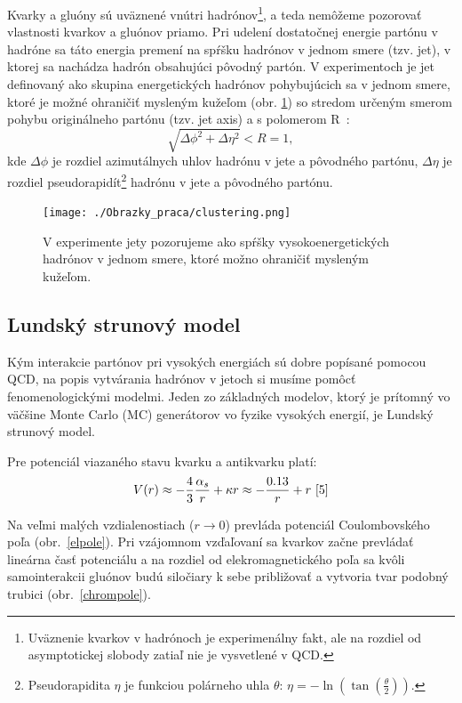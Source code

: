 \documentclass[thesismargins, thesislinespacing]{rnthesis}
\begin{document}
Kvarky a gluóny sú uväznené vnútri hadrónov\footnote{Uväznenie kvarkov v hadrónoch je experimenálny fakt, ale na rozdiel od asymptotickej slobody zatiaľ nie je vysvetlené v QCD.}, a teda nemôžeme pozorovať vlastnosti kvarkov a gluónov priamo. Pri udelení dostatočnej energie partónu v hadróne sa táto energia premení na spŕšku hadrónov v jednom smere (tzv. jet), v ktorej sa nachádza hadrón obsahujúci pôvodný partón. V experimentoch je jet definovaný ako skupina energe\-tických hadrónov pohybujúcich sa v jednom smere, ktoré je možné ohraničiť mysleným kužeľom (obr. \ref{jety}) so stredom určeným smerom pohybu originálneho partónu (tzv. jet axis) a s polomerom R~\cite{4}:
\begin{equation}
\sqrt{\Delta \phi^2 + \Delta \eta^2}<R=1,
\end{equation}
kde $\Delta \phi$ je rozdiel azimutálnych uhlov hadrónu v jete a pôvodného partónu, $\Delta \eta$ je rozdiel pseudorapidít\footnote{Pseudorapidita $\eta$ je funkciou polárneho uhla $\theta$: $\eta = - \ln( \tan (\frac{\theta}{2}))$.} hadrónu v jete a pôvodného partónu.
\begin{figure}
	\centering
	\texttt{[image: ./Obrazky\_praca/clustering.png]}
	\caption{V experimente jety pozorujeme ako spŕšky vysokoenergetických hadrónov v jednom smere, ktoré možno ohraničiť mysleným kužeľom.}
	\label{jety}
\end{figure}

\subsection{Lundský strunový model}
Kým interakcie partónov pri vysokých energiách sú dobre popísané pomocou QCD, na popis vytvárania hadrónov v jetoch si musíme pomôcť fenomenologickými \-mo\-del\-mi. Jeden zo základných modelov, ktorý je prítomný vo väčšine Monte Carlo (MC) generátorov vo fyzike vysokých energií, je Lundský strunový model.

Pre potenciál viazaného stavu kvarku a antikvarku platí:
\begin{equation}
	V(r) \approx - \frac{4}{3} \frac{\alpha_s}{r} + \kappa r \approx - \frac{0.13}{r} + r~\cite{5}
\end{equation}

Na veľmi malých vzdialenostiach ($r\rightarrow0$) prevláda potenciál Coulombovského poľa (obr.~\ref{elpole}). Pri vzájomnom vzďaľovaní sa kvarkov začne prevládať lineárna časť potenciálu a na rozdiel od elekromagnetického poľa sa kvôli samointerakcii gluónov budú siločiary k sebe približovať a vytvoria tvar podobný trubici (obr.~\ref{chrompole}).
\end{document}
